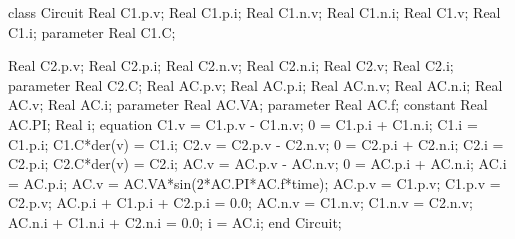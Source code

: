 \begin{boxedverbatim}
class Circuit
  Real C1.p.v;
  Real C1.p.i;
  Real C1.n.v;
  Real C1.n.i;
  Real C1.v;
  Real C1.i;
  parameter Real C1.C;

  Real C2.p.v;
  Real C2.p.i;
  Real C2.n.v;
  Real C2.n.i;
  Real C2.v;
  Real C2.i;
  parameter Real C2.C;
  Real AC.p.v;
  Real AC.p.i;
  Real AC.n.v;
  Real AC.n.i;
  Real AC.v;
  Real AC.i;
  parameter Real AC.VA;
  parameter Real AC.f;
  constant Real AC.PI;
  Real i;
equation
  C1.v = C1.p.v - C1.n.v;
  0 = C1.p.i + C1.n.i;
  C1.i = C1.p.i;
  C1.C*der(v) = C1.i;
  C2.v = C2.p.v - C2.n.v;
  0 = C2.p.i + C2.n.i;
  C2.i = C2.p.i;
  C2.C*der(v) = C2.i;
  AC.v = AC.p.v - AC.n.v;
  0 = AC.p.i + AC.n.i;
  AC.i = AC.p.i;
  AC.v = AC.VA*sin(2*AC.PI*AC.f*time);
  AC.p.v = C1.p.v;
  C1.p.v = C2.p.v;
  AC.p.i + C1.p.i + C2.p.i = 0.0;
  AC.n.v = C1.n.v;
  C1.n.v = C2.n.v;
  AC.n.i + C1.n.i + C2.n.i = 0.0;
  i = AC.i;
end Circuit;
\end{boxedverbatim}
